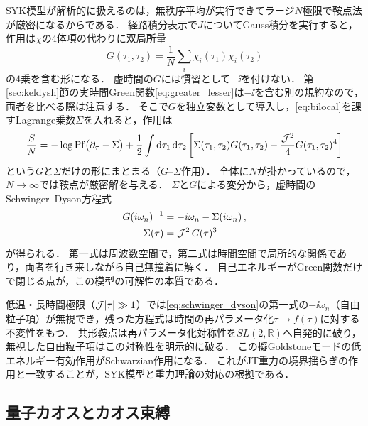 \documentclass[a4paper,11pt,onecolumn]{jlreq}
\begin{document}
SYK模型が解析的に扱えるのは，無秩序平均が実行できてラージ$N$極限で鞍点法が厳密になるからである．
経路積分表示で$J$についてGauss積分を実行すると，作用は$\chi$の$4$体項の代わりに双局所量
\begin{equation}
  G(\tau_1,\tau_2) = \frac{1}{N}\sum_i \chi_i(\tau_1)\chi_i(\tau_2)
  \label{eq:bilocal}
\end{equation}
の$4$乗を含む形になる．
虚時間の$G$には慣習として$-\ii$を付けない．
第\ref{sec:keldysh}節の実時間Green関数\eqref{eq:greater_lesser}は$-\ii$を含む別の規約なので，両者を比べる際は注意する．
そこで$G$を独立変数として導入し，\eqref{eq:bilocal}を課すLagrange乗数$\Sigma$を入れると，作用は
\begin{equation}
  \frac{S}{N} = -\log\mathrm{Pf}\big(\partial_\tau-\Sigma\big)
    + \frac{1}{2}\int\dd{\tau_1}\dd{\tau_2}
      \left[\Sigma(\tau_1,\tau_2)G(\tau_1,\tau_2)
        - \frac{\mathcal{J}^2}{4}G(\tau_1,\tau_2)^4\right]
  \label{eq:gsigma}
\end{equation}
という$G$と$\Sigma$だけの形にまとまる（$G$--$\Sigma$作用）．
全体に$N$が掛かっているので，$N\to\infty$では鞍点が厳密解を与える．
$\Sigma$と$G$による変分から，虚時間のSchwinger--Dyson方程式
\begin{equation}
  \begin{split}
    G(i\omega_n)^{-1} &= -i\omega_n - \Sigma(i\omega_n)\,,\\
    \Sigma(\tau) &= \mathcal{J}^2\,G(\tau)^3
  \end{split}
  \label{eq:schwinger_dyson}
\end{equation}
が得られる．
第一式は周波数空間で，第二式は時間空間で局所的な関係であり，両者を行き来しながら自己無撞着に解く．
自己エネルギーがGreen関数だけで閉じる点が，この模型の可解性の本質である．

低温・長時間極限（$\mathcal{J}\abs{\tau}\gg1$）では\eqref{eq:schwinger_dyson}の第一式の$-\ii\omega_n$（自由粒子項）が無視でき，残った方程式は時間の再パラメータ化$\tau\to f(\tau)$に対する不変性をもつ．
共形鞍点は再パラメータ化対称性を$SL(2,\mathbb{R})$へ自発的に破り，無視した自由粒子項はこの対称性を明示的に破る．
この擬Goldstoneモードの低エネルギー有効作用がSchwarzian作用になる\cite{MaldacenaStanford2016}．
これがJT重力の境界揺らぎの作用と一致することが，SYK模型と重力理論の対応の根拠である．

\subsection{量子カオスとカオス束縛}
\label{sec:syk_chaos}
\end{document}
